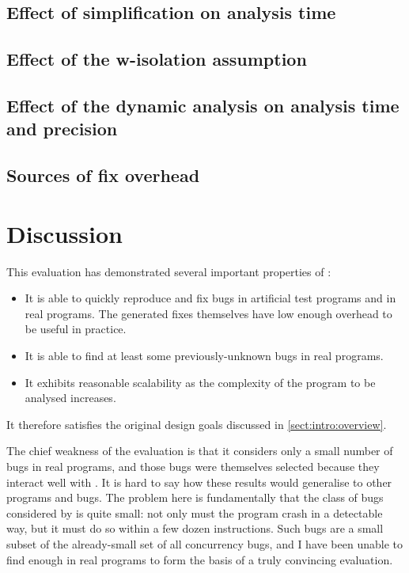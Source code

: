 \subsection{Effect of {\StateMachine} simplification on analysis time}


\subsection{Effect of the \gls{w-isolation} assumption}

\subsection{Effect of the dynamic analysis on analysis time and precision}

\subsection{Sources of fix overhead}

\section{Discussion}

This evaluation has demonstrated several important properties of
{\technique}:
\begin{itemize}
\item It is able to quickly reproduce and fix bugs in artificial test
  programs and in real programs.  The generated fixes themselves have
  low enough overhead to be useful in practice.
\item It is able to find at least some previously-unknown bugs in real
  programs.
\item It exhibits reasonable scalability as the complexity of the
  program to be analysed increases.
\end{itemize}
It therefore satisfies the original design goals discussed in
\autoref{sect:intro:overview}.

The chief weakness of the evaluation is that it considers only a small
number of bugs in real programs, and those bugs were themselves
selected because they interact well with {\technique}.  It is hard to
say how these results would generalise to other programs and bugs.
The problem here is fundamentally that the class of bugs considered by
{\technique} is quite small: not only must the program crash in a
detectable way, but it must do so within a few dozen instructions.
Such bugs are a small subset of the already-small set of all
concurrency bugs, and I have been unable to find enough in real
programs to form the basis of a truly convincing evaluation.

